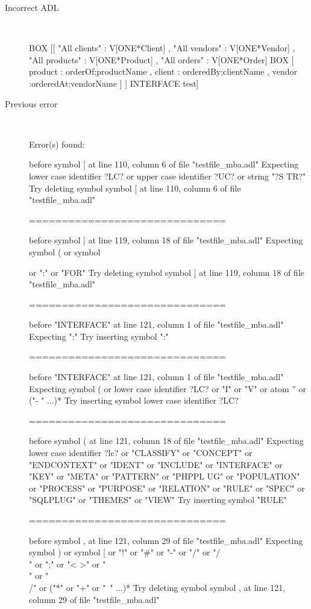 \hrulefill

\begin{description}
  \item[Incorrect ADL]~\\
\begin{adl}
BOX [[ "All clients"  : V[ONE*Client]
   , "All vendors"  : V[ONE*Vendor] 
   , "All products" : V[ONE*Product]
   , "All orders"   : V[ONE*Order]
     BOX [ product : orderOf;productName
         , client  : orderedBy;clientName
         , vendor  :orderedAt;vendorName
         ] 
   ]
   INTERFACE test]\end{adl}
  \item[Previous error]~\\
\begin{haskell}
Error(s) found:

before symbol [ at line 110, column 6 of file "testfile_mba.adl"
Expecting lower case identifier ?LC? or upper case identifier ?UC? or string "?S
TR?"
Try deleting symbol symbol [ at line 110, column 6 of file "testfile_mba.adl"

==============================

before symbol ] at line 119, column 18 of file "testfile_mba.adl"
Expecting symbol ( or symbol { or ":" or "FOR"
Try deleting symbol symbol ] at line 119, column 18 of file "testfile_mba.adl"

==============================

before "INTERFACE" at line 121, column 1 of file "testfile_mba.adl"
Expecting ":"
Try inserting symbol ":"

==============================

before "INTERFACE" at line 121, column 1 of file "testfile_mba.adl"
Expecting symbol ( or lower case identifier ?LC? or "I" or "V" or atom '' or ("-
" ...)*
Try inserting symbol lower case identifier ?LC?

==============================

before symbol ( at line 121, column 18 of file "testfile_mba.adl"
Expecting lower case identifier ?lc? or "CLASSIFY" or "CONCEPT" or "ENDCONTEXT"
or "IDENT" or "INCLUDE" or "INTERFACE" or "KEY" or "META" or "PATTERN" or "PHPPL
UG" or "POPULATION" or "PROCESS" or "PURPOSE" or "RELATION" or "RULE" or "SPEC"
or "SQLPLUG" or "THEMES" or "VIEW"
Try inserting symbol "RULE"

==============================

before symbol , at line 121, column 29 of file "testfile_mba.adl"
Expecting symbol ) or symbol [ or "!" or "#" or "-" or "/" or "/\\" or ";" or "<
>" or "\\" or "\\/" or ("*" or "+" or "~" ...)*
Try deleting symbol symbol , at line 121, column 29 of file "testfile_mba.adl"

}
\end{haskell}
\end{description}
